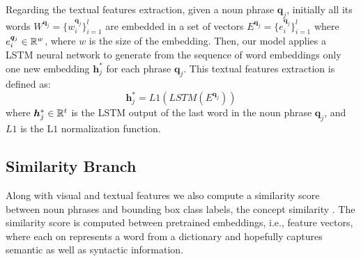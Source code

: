 \documentclass{article}
\begin{document}
Regarding the textual features extraction, given a noun phrase
$\bm{q}_j$, initially all its words $W^{\bm{q}_j} = \{ w^{\bm{q}_j}_i
\}^l_{i=1}$ are embedded in a set of vectors $E^{\bm{q}_j} =
\{e^{\bm{q}_j}_i \}^l_{i=1}$ where $e^{\bm{q}_j}_i \in \mathbb{R}^w$, where
$w$ is the size of the embedding. Then, our model applies a LSTM
neural network to generate from the sequence of word embeddings only
one new embedding $\bm{h}^*_j$ for each phrase $\bm{q}_j$. This
textual features extraction is defined as:
\begin{equation}
  \bm{h}^*_j = L1(LSTM(E^{\bm{q}_j}))
\end{equation}
where $\bm{h}^*_j \in \mathbb{R}^t$ is the LSTM output of the last word in
the noun phrase $\bm{q}_j$, and $L1$ is the L$1$ normalization
function.

\subsection{Similarity Branch}

Along with visual and textual features we also compute a similarity
score between noun phrases and bounding box class labels, the concept
similarity \cite{wang2019phrase}. The similarity score is computed
between pretrained embeddings, i.e., feature vectors, where each on
represents a word from a dictionary and hopefully captures semantic as
well as syntactic information.
\end{document}
